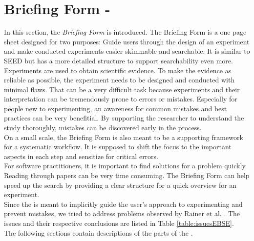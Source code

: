 
\section{Briefing Form - \briefingform}
\label{sec:briefing form}

In this section, the \textit{Briefing Form} is introduced. The Briefing Form is a one page sheet designed for two purposes: Guide users through the design of an experiment and make conducted experiments easier skimmable and searchable. It is similar to SEED but has a more detailed structure to support searchability even more.\\
Experiments are used to obtain scientific evidence. To make the evidence as reliable as possible, the experiment needs to be designed and conducted with minimal flaws. That can be a very difficult task because experiments and their interpretation can be tremendously prone to errors or mistakes. Especially for people new to experimenting, an awareness for common mistakes and best practices can be very benefitial. By supporting the researcher to understand the study thoroughly, mistakes can be discovered early in the process.\\
On a small scale, the Briefing Form is also meant to be a  supporting framework for a systematic workflow. It is supposed to shift the focus to the important aspects in each step and sensitize for critical errors.\\
For software practitioners, it is important to find solutions for a problem quickly. Reading through papers can be very time consuming. The Briefing Form can help speed up the search by providing a clear structure for a quick overview for an experiment.\\
Since the \briefingform is meant to implicitly guide the user's approach to experimenting and prevent mistakes, we tried to address problems observed  by Rainer et al. \cite{Rainer2006}. The issues and their respective conclusions are listed in Table \ref{table:issuesEBSE}.\\

The following sections contain descriptions of the parts of the \briefingform.

